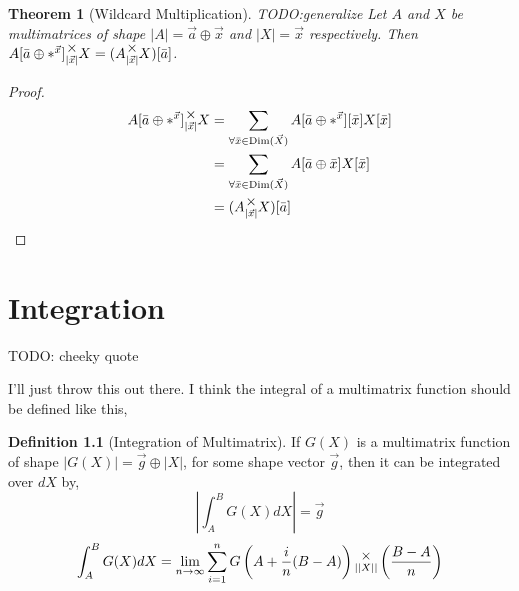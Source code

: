 \documentclass[12pt]{book}
\theoremstyle{plain}
\newtheorem{theorem}{Theorem}[chapter]
\theoremstyle{definition}
\newtheorem{definition}{Definition}[chapter]
\theoremstyle{ppart}
\theoremstyle{case}
\theoremstyle{solution}
\DeclareMathOperator{\Dim}{Dim}
\newcommand{\mmult}[1]{\text{\raisebox{1ex}{$\underset{#1}{\times}$}}}
\newcommand{\shape}[1]{\left|#1\right|}
\begin{document}
\begin{theorem}[Wildcard Multiplication]
TODO:generalize
Let $A$ and $X$ be multimatrices of shape $\shape{A} = \vec{a} \oplus \vec{x}$ and $\shape{X} = \vec{x}$ respectively.
Then $A[\bar{a} \oplus *^{\vec{x}}] \mmult{\shape{\vec{x}}} X = (A \mmult{\shape{\vec{x}}} X)[\bar{a}]$.
\end{theorem}
\begin{proof}
\begin{align*}
  A[\bar{a} \oplus *^{\vec{x}}] \mmult{\shape{\vec{x}}} X
  &=
  \sum_{\forall \bar{x} \in \Dim(\vec{X})} A[\bar{a} \oplus *^{\vec{x}}][\bar{x}] X[\bar{x}] \\
  &=
  \sum_{\forall \bar{x} \in \Dim(\vec{X})} A[\bar{a} \oplus \bar{x}] X[\bar{x}] \\
  &= (A \mmult{\shape{\vec{x}}} X)[\bar{a}]
\end{align*}
\end{proof}


\chapter{Integration}

\begin{displayquote}
TODO: cheeky quote
\end{displayquote}

I'll just throw this out there. I think the integral of a multimatrix function should
be defined like this,

\begin{definition}[Integration of Multimatrix]
If $G(X)$ is a multimatrix function of shape $\shape{G(X)} = \vec{g} \oplus \shape{X}$,
for some shape vector $\vec{g}$, then it can be integrated over $dX$ by,
\[ \shape{\int_A^B G(X) dX} = \vec{g} \]
\[
 \int_A^B G(X) dX = \lim_{n \to \infty}
 \sum_{i=1}^n
  G\left(A+\frac{i}{n}(B-A)\right)
  \mmult{\shape{\shape{X}}}
  \left(\frac{B-A}{n}\right)
\]
\end{definition}
\end{document}
